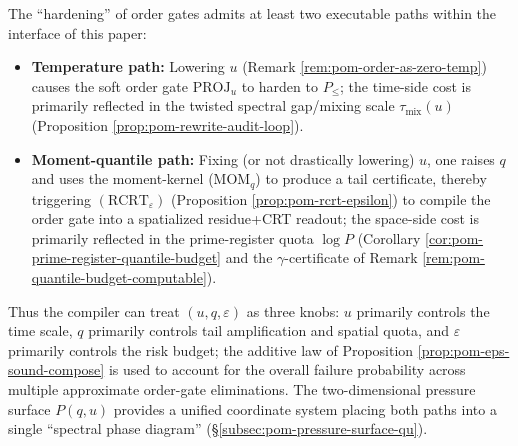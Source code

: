 \begin{remark}\label{rem:pom-hardening-u-vs-q}
The ``hardening'' of order gates admits at least two executable paths within the interface of this paper:
\begin{itemize}
  \item \textbf{Temperature path:} Lowering \(u\) (Remark \ref{rem:pom-order-as-zero-temp}) causes the soft order gate \(\mathrm{PROJ}_u\) to harden to \(P_{\le}\); the time-side cost is primarily reflected in the twisted spectral gap/mixing scale \(\tau_{\mathrm{mix}}(u)\) (Proposition \ref{prop:pom-rewrite-audit-loop}).
  \item \textbf{Moment-quantile path:} Fixing (or not drastically lowering) \(u\), one raises \(q\) and uses the moment-kernel (\(\mathrm{MOM}_q\)) to produce a tail certificate, thereby triggering \((\mathrm{RCRT}_\varepsilon)\) (Proposition \ref{prop:pom-rcrt-epsilon}) to compile the order gate into a spatialized residue+CRT readout; the space-side cost is primarily reflected in the prime-register quota \(\log P\) (Corollary \ref{cor:pom-prime-register-quantile-budget} and the \(\gamma\)-certificate of Remark \ref{rem:pom-quantile-budget-computable}).
\end{itemize}
Thus the compiler can treat \((u,q,\varepsilon)\) as three knobs: \(u\) primarily controls the time scale, \(q\) primarily controls tail amplification and spatial quota, and \(\varepsilon\) primarily controls the risk budget; the additive law of Proposition \ref{prop:pom-eps-sound-compose} is used to account for the overall failure probability across multiple approximate order-gate eliminations.
The two-dimensional pressure surface \(P(q,u)\) provides a unified coordinate system placing both paths into a single ``spectral phase diagram'' (\S\ref{subsec:pom-pressure-surface-qu}).
\end{remark}

